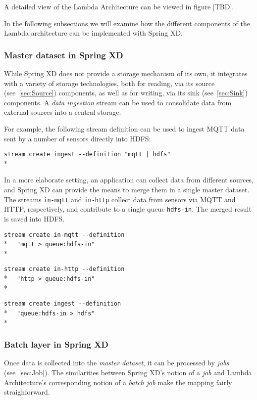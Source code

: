 A detailed view of the Lambda Architecture can be viewed in figure [TBD].

In the following subsections we will examine how the different components
of the Lambda architecture can be implemented with Spring XD.

\subsubsection {Master dataset in Spring XD}

While Spring XD does not provide a storage mechanism of its own, it 
integrates with a variety of storage technologies, both for reading,
via its source (see~\ref{sec:Source}) components, as well as for writing, via 
its sink (see~\ref{sec:Sink}) components. A \emph{data ingestion}
stream can be used to consolidate data from external sources into a
central storage.

For example, the following stream definition can be used to ingest 
MQTT data sent by a number of sensors directly into HDFS:

\verb;stream create ingest --definition "mqtt | hdfs";\\*

In a more elaborate setting, an application can collect data from
different sources, and Spring XD can provide the means to merge them
in a single master dataset. The streams \texttt{in-mqtt} and \texttt{in-http}
collect data from sensors via MQTT and HTTP, respectively, and
contribute to a single queue \texttt{hdfs-in}. The merged result
is saved into HDFS.

\verb;stream create in-mqtt --definition ;\\*
\verb;  "mqtt > queue:hdfs-in";\\*

\verb;stream create in-http --definition  ;\\*
\verb;  "http > queue:hdfs-in";\\*

\verb;stream create ingest --definition  ;\\*
\verb;  "queue:hdfs-in > hdfs";\\*

\subsubsection {Batch layer in Spring XD}

Once data is collected into the \emph{master dataset}, it can be processed
by \emph{jobs} (see~\ref{sec:Job}). The similarities between Spring XD's
notion of a \emph{job} and Lambda Architecture's corresponding notion of
a \emph{batch job} make the mapping fairly straighforward.


